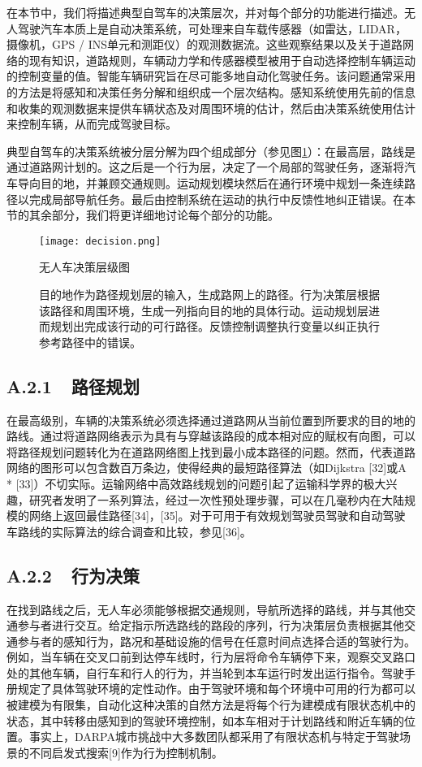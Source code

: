 在本节中，我们将描述典型自驾车的决策层次，并对每个部分的功能进行描述。无人驾驶汽车本质上是自动决策系统，可处理来自车载传感器（如雷达，LIDAR，摄像机，GPS / INS单元和测距仪）的观测数据流。这些观察结果以及关于道路网络的现有知识，道路规则，车辆动力学和传感器模型被用于自动选择控制车辆运动的控制变量的值。智能车辆研究旨在尽可能多地自动化驾驶任务。该问题通常采用的方法是将感知和决策任务分解和组织成一个层次结构。感知系统使用先前的信息和收集的观测数据来提供车辆状态及对周围环境的估计，然后由决策系统使用估计来控制车辆，从而完成驾驶目标。

典型自驾车的决策系统被分层分解为四个组成部分（参见图\ref{fig:decision}）：在最高层，路线是通过道路网计划的。这之后是一个行为层，决定了一个局部的驾驶任务，逐渐将汽车导向目的地，并兼顾交通规则。运动规划模块然后在通行环境中规划一条连续路径以完成局部导航任务。最后由控制系统在运动的执行中反馈性地纠正错误。在本节的其余部分，我们将更详细地讨论每个部分的功能。

\begin{figure}
\centering
\texttt{[image: decision.png]}
\caption{无人车决策层级图}
\caption*{目的地作为路径规划层的输入，生成路网上的路径。行为决策层根据该路径和周围环境，生成一列指向目的地的具体行动。运动规划层进而规划出完成该行动的可行路径。反馈控制调整执行变量以纠正执行参考路径中的错误。}
\label{fig:decision}
\end{figure}

\subsection*{A.2.1\ \ 路径规划}
在最高级别，车辆的决策系统必须选择通过道路网从当前位置到所要求的目的地的路线。通过将道路网络表示为具有与穿越该路段的成本相对应的赋权有向图，可以将路径规划问题转化为在道路网络图上找到最小成本路径的问题。然而，代表道路网络的图形可以包含数百万条边，使得经典的最短路径算法（如Dijkstra [32]或A * [33]）不切实际。运输网络中高效路线规划的问题引起了运输科学界的极大兴趣，研究者发明了一系列算法，经过一次性预处理步骤，可以在几毫秒内在大陆规模的网络上返回最佳路径[34]，[35]。对于可用于有效规划驾驶员驾驶和自动驾驶车路线的实际算法的综合调查和比较，参见[36]。

\subsection*{A.2.2\ \ 行为决策}
在找到路线之后，无人车必须能够根据交通规则，导航所选择的路线，并与其他交通参与者进行交互。给定指示所选路线的路段的序列，行为决策层负责根据其他交通参与者的感知行为，路况和基础设施的信号在任意时间点选择合适的驾驶行为。例如，当车辆在交叉口前到达停车线时，行为层将命令车辆停下来，观察交叉路口处的其他车辆，自行车和行人的行为，并当轮到本车运行时发出运行指令。驾驶手册规定了具体驾驶环境的定性动作。由于驾驶环境和每个环境中可用的行为都可以被建模为有限集，自动化这种决策的自然方法是将每个行为建模成有限状态机中的状态，其中转移由感知到的驾驶环境控制，如本车相对于计划路线和附近车辆的位置。事实上，DARPA城市挑战中大多数团队都采用了有限状态机与特定于驾驶场景的不同启发式搜索[9]作为行为控制机制。

